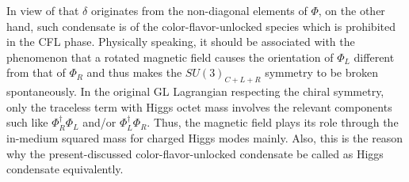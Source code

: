 \documentclass[12pt]{article}
\begin{document}
In view of that $\delta$ originates from the non-diagonal elements of $\Phi$, on the other hand, such condensate is of the color-flavor-unlocked species which is prohibited in the CFL phase.
Physically speaking, it should be associated with the phenomenon that a rotated magnetic field causes the orientation of $\Phi_L$ different from that of $\Phi_R$ and thus makes the $SU (3)_{C+L+R}$ symmetry to be broken spontaneously.
In the original GL Lagrangian respecting the chiral symmetry, only the traceless term with Higgs octet mass involves the relevant components such like $\Phi_R^\dagger\Phi_L$ and/or $\Phi_L^\dagger\Phi_R$.
Thus, the magnetic field plays its role through the in-medium squared mass for charged Higgs modes mainly. Also, this is the reason why the present-discussed color-flavor-unlocked condensate be called as Higgs condensate equivalently.
\end{document}
